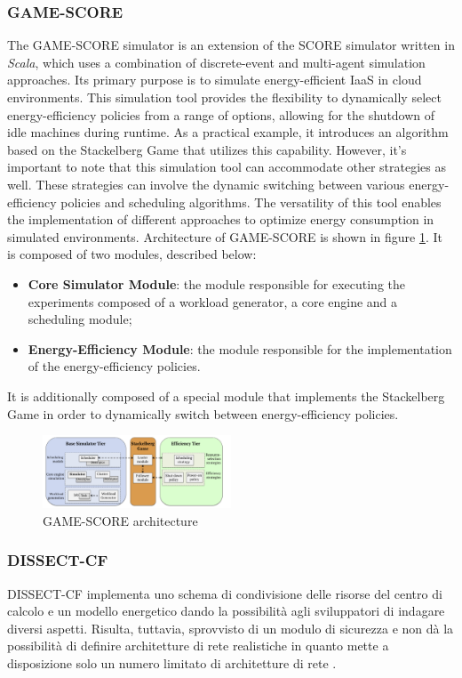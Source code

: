 {\subsubsection*{GAME-SCORE}
The GAME-SCORE simulator is an extension of the SCORE simulator written in \emph{Scala}, which uses a combination of discrete-event and multi-agent simulation approaches. Its primary purpose is to simulate energy-efficient IaaS in cloud environments. This simulation tool provides the flexibility to dynamically select energy-efficiency policies from a range of options, allowing for the shutdown of idle machines during runtime. As a practical example, it introduces an algorithm based on the Stackelberg Game that utilizes this capability. However, it's important to note that this simulation tool can accommodate other strategies as well. These strategies can involve the dynamic switching between various energy-efficiency policies and scheduling algorithms. The versatility of this tool enables the implementation of different approaches to optimize energy consumption in simulated environments.
Architecture of GAME-SCORE is shown in figure \ref{fig:gamescore_arch}. It is composed of two modules, described below:
\begin{itemize}
    \item \textbf{Core Simulator Module}: the module responsible for executing the experiments composed of a workload generator, a core engine and a scheduling module;
    \item \textbf{Energy-Efficiency Module}: the module responsible for the implementation of the energy-efficiency policies.
\end{itemize}
It is additionally composed of a special module that implements the Stackelberg Game in order to dynamically switch between energy-efficiency policies. 
\begin{figure}[h]
    \centering
    \includegraphics[width=0.5\textwidth]{chapters/images/gamescore_arch.png}
    \caption{GAME-SCORE architecture}
    \label{fig:gamescore_arch}
\end{figure}
\subsubsection*{DISSECT-CF}
DISSECT-CF \cite{kecskemeti2015dissect} implementa uno schema di condivisione delle risorse del centro di calcolo e un modello energetico dando la possibilità agli sviluppatori di indagare diversi aspetti. Risulta, tuttavia, sprovvisto di un modulo di sicurezza e non dà la possibilità di definire architetture di rete realistiche in quanto mette a disposizione solo un numero limitato di architetture di rete \cite{mansouri2020cloud}.
}
